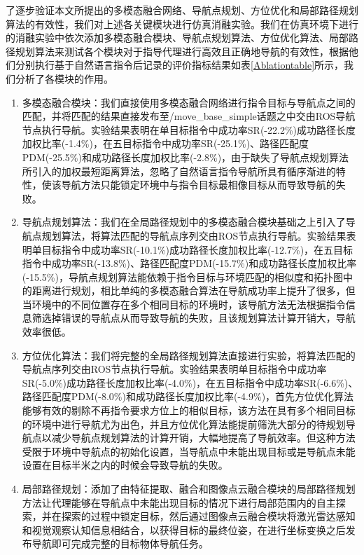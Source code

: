 了逐步验证本文所提出的多模态融合网络、导航点规划、方位优化和局部路径规划算法的有效性，我们对上述各关键模块进行仿真消融实验。我们在仿真环境下进行的消融实验中依次添加多模态融合模块、导航点规划算法、方位优化算法、局部路径规划算法来测试各个模块对于指导代理进行高效且正确地导航的有效性，根据他们分别执行基于自然语言指令后记录的评价指标结果如表\ref{Ablationtable}所示，我们分析了各模块的作用。
\begin{enumerate}[topsep = 0 pt, itemsep= 0 pt, parsep=0pt, partopsep=0pt, leftmargin=44pt, itemindent=0pt, labelsep=6pt, label=(\arabic*)]
    \item 	多模态融合模块：我们直接使用多模态融合网络进行指令目标与导航点之间的匹配，并将匹配的结果直接发布至/move\_base\_simple话题之中交由ROS导航节点执行导航。实验结果表明在单目标指令中成功率SR(-22.2\%)成功路径长度加权比率(-1.4\%)，在五目标指令中成功率SR(-25.1\%)、路径匹配度PDM(-25.5\%)和成功路径长度加权比率(-2.8\%)，由于缺失了导航点规划算法所引入的加权最短距离算法，忽略了自然语言指令导航所具有循序渐进的特性，使该导航方法只能锁定环境中与指令目标最相像目标从而导致导航的失败。
    \item	导航点规划算法：我们在全局路径规划中的多模态融合模块基础之上引入了导航点规划算法，将算法匹配的导航点序列交由ROS节点执行导航。实验结果表明单目标指令中成功率SR(-10.1\%)成功路径长度加权比率(-12.7\%)，在五目标指令中成功率SR(-13.8\%)、路径匹配度PDM(-15.7\%)和成功路径长度加权比率(-15.5\%)，导航点规划算法能依赖于指令目标与环境匹配的相似度和拓扑图中的距离进行规划，相比单纯的多模态融合算法在导航成功率上提升了很多，但当环境中的不同位置存在多个相同目标的环境时，该导航方法无法根据指令信息筛选掉错误的导航点从而导致导航的失败，且该规划算法计算开销大，导航效率很低。
    \item   方位优化算法：我们将完整的全局路径规划算法直接进行实验，将算法匹配的导航点序列交由ROS节点执行导航。实验结果表明单目标指令中成功率SR(-5.0\%)成功路径长度加权比率(-4.0\%)，在五目标指令中成功率SR(-6.6\%)、路径匹配度PDM(-8.0\%)和成功路径长度加权比率(-4.9\%)，首先方位优化算法能够有效的剔除不再指令要求方位上的相似目标，该方法在具有多个相同目标的环境中进行导航尤为出色，并且方位优化算法能提前筛洗大部分的待规划导航点以减少导航点规划算法的计算开销，大幅地提高了导航效率。但这种方法受限于环境中导航点的初始化设置，当导航点中未能出现目标或是导航点未能设置在目标半米之内的时候会导致导航的失败。
    \item   局部路径规划：添加了由特征提取、融合和图像点云融合模块的局部路径规划方法让代理能够在导航点中未能出现目标的情况下进行局部范围内的自主探索，并在探索的过程中锁定目标，然后通过图像点云融合模块将激光雷达感知和视觉观察认知信息相结合，以获得目标的最终位姿，在进行坐标变换之后发布导航即可完成完整的目标物体导航任务。
	
\end{enumerate}

